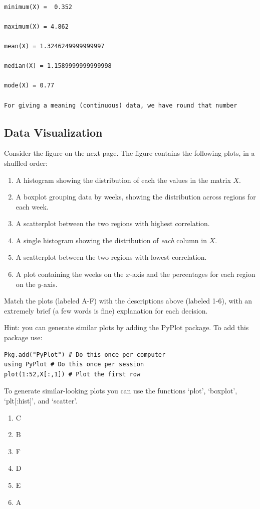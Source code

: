 \documentclass{article}
\def\blu#1{{\color{blu}#1}}
\def\enum#1{\begin{enumerate}#1\end{enumerate}}
\begin{document}
\begin{verbatim}

minimum(X) =  0.352

maximum(X) = 4.862

mean(X) = 1.3246249999999997

median(X) = 1.1589999999999998

mode(X) = 0.77

For giving a meaning (continuous) data, we have round that number

\end{verbatim}


\subsection{Data Visualization}

Consider the figure on the next page.
The figure contains the following plots, in a shuffled order:
\enum{
\item A histogram showing the distribution of each the values in the matrix $X$.
\item A boxplot grouping data by weeks, showing the distribution across regions for each week.
\item A scatterplot between the two regions with highest correlation.
\item A single histogram showing the distribution of \emph{each} column in $X$.
\item A scatterplot between the two regions with lowest correlation.
\item A plot containing the weeks on the $x$-axis and the percentages for each region on the $y$-axis.
}
\blu{Match the plots (labeled A-F) with the descriptions above (labeled 1-6), with an extremely brief (a few words is fine) explanation for each decision.}

Hint: you can generate similar plots by adding the PyPlot package. To add this package use:
\begin{verbatim}
Pkg.add("PyPlot") # Do this once per computer
using PyPlot # Do this once per session
plot(1:52,X[:,1]) # Plot the first row
\end{verbatim}
To generate similar-looking plots you can use the functions `plot', `boxplot', `plt[:hist]', and `scatter'.

\begin{enumerate}
\item C
\item B
\item F
\item D
\item E
\item A
\end{enumerate}
\end{document}
